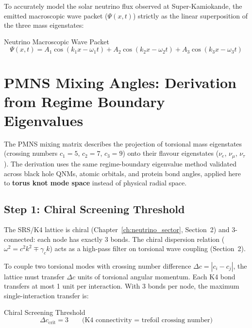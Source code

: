 To accurately model the solar neutrino flux observed at Super-Kamiokande, the emitted macroscopic wave packet ($\Psi(x,t)$) strictly as the linear superposition of the three mass eigenstates:
\begin{resultbox}{Neutrino Macroscopic Wave Packet}
\begin{equation}
    \Psi(x,t) = A_1 \cos(k_1 x - \omega_1 t) + A_2 \cos(k_2 x - \omega_2 t) + A_3 \cos(k_3 x - \omega_3 t)
\end{equation}
\end{resultbox}

\section{PMNS Mixing Angles: Derivation from Regime Boundary Eigenvalues}

The PMNS mixing matrix describes the projection of torsional mass eigenstates (crossing numbers $c_1 = 5$, $c_2 = 7$, $c_3 = 9$) onto their flavour eigenstates ($\nu_e$, $\nu_\mu$, $\nu_\tau$). The derivation uses the same regime-boundary eigenvalue method validated across black hole QNMs, atomic orbitals, and protein bond angles, applied here to \textbf{torus knot mode space} instead of physical radial space.

\subsection{Step 1: Chiral Screening Threshold}
\label{sec:chiral_screening}

The SRS/K4 lattice is chiral (Chapter~\ref{ch:neutrino_sector}, Section~2) and 3-connected: each node has exactly 3 bonds. The chiral dispersion relation ($\omega^2 = c^2 k^2 \mp \gamma_c k$) acts as a high-pass filter on torsional wave coupling (Section~2).

To couple two torsional modes with crossing number difference $\Delta c = |c_i - c_j|$, the lattice must transfer $\Delta c$ units of torsional angular momentum. Each K4 bond transfers at most 1 unit per interaction. With 3 bonds per node, the maximum single-interaction transfer is:
\begin{resultbox}{Chiral Screening Threshold}
\begin{equation}
    \Delta c_{\text{crit}} = 3 \qquad \text{(K4 connectivity = trefoil crossing number)}
    \label{eq:chiral_threshold}
\end{equation}
\end{resultbox}

